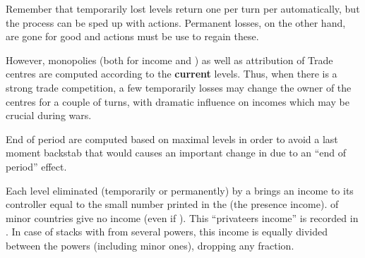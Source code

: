 \begin{playtip}
  Remember that temporarily lost levels return one per turn per \TradeFLEET
  automatically, but the process can be sped up with \TFI actions. Permanent
  losses, on the other hand, are gone for good and \TFI actions must be use to
  regain these.

  However, monopolies (both for income and \VPs) as well as attribution of
  Trade centres are computed according to the \textbf{current} levels. Thus,
  when there is a strong trade competition, a few temporarily losses may
  change the owner of the centres for a couple of turns, with dramatic
  influence on incomes which may be crucial during wars.

  End of period \VPs are computed based on maximal levels in order to avoid a
  last moment backstab that would causes an important change in \VPs due to an
  ``end of period'' effect.
\end{playtip}

 Each level eliminated (temporarily or
permanently) by a \corsaire brings an income to its controller equal to the
small number printed in the \STZ (the presence income). \corsaire of minor
countries give no income (even if \VASSAL).
\bparag This ``privateers income'' is recorded in .
\bparag In case of stacks with \corsaire from several powers, this income is
equally divided between the powers (including minor ones), dropping any
fraction.

